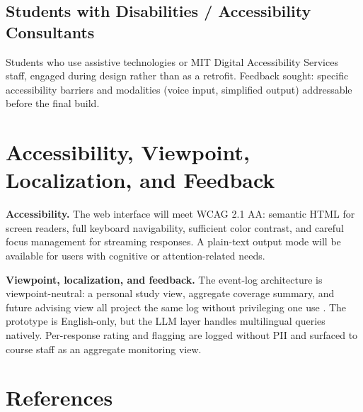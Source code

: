 \documentclass[12pt]{article}
\begin{document}
\subsection{Students with Disabilities / Accessibility Consultants}

Students who use assistive technologies or MIT Digital Accessibility Services
staff, engaged during design rather than as a retrofit. Feedback sought:
specific accessibility barriers and modalities (voice input, simplified output)
addressable before the final build.

\section{Accessibility, Viewpoint, Localization, and Feedback}

\textbf{Accessibility.} The web interface will meet WCAG 2.1 AA: semantic HTML
for screen readers, full keyboard navigability, sufficient color contrast, and
careful focus management for streaming responses. A plain-text output mode will
be available for users with cognitive or attention-related needs.

\textbf{Viewpoint, localization, and feedback.} The event-log architecture is
viewpoint-neutral: a personal study view, aggregate coverage summary, and
future advising view all project the same log without privileging one use
\parencite{cms594staff2025}. The prototype is English-only, but the LLM layer
handles multilingual queries natively. Per-response rating and flagging are
logged without PII and surfaced to course staff as an aggregate monitoring view.

\section{References}
\printbibliography[heading=none]
\end{document}
